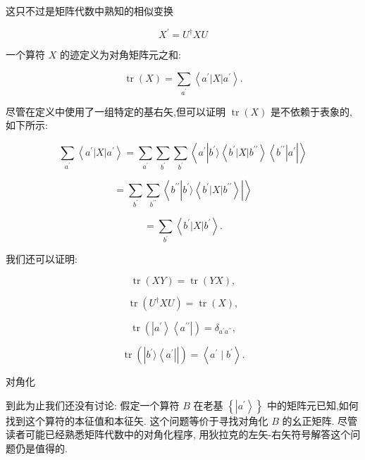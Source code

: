 \documentclass[lang=cn,newtx,10pt,scheme=chinese,thmcnt=section]{elegantbook}
\begin{document}
这只不过是矩阵代数中熟知的相似变换

$$
{X}^{\prime } = {U}^{ \dagger }{XU} \tag{1.5.13}
$$

一个算符 $X$ 的迹定义为对角矩阵元之和:

$$
\operatorname{tr}\left( X\right) = \mathop{\sum }\limits_{{a}^{\prime }}\left\langle {{a}^{\prime }\left| X\right| {a}^{\prime }}\right\rangle . \tag{1. 5.14}
$$

尽管在定义中使用了一组特定的基右矢,但可以证明 $\operatorname{tr}\left( X\right)$ 是不依赖于表象的,如下所示:

$$
\mathop{\sum }\limits_{{a}^{\prime }}\left\langle {{a}^{\prime }\left| X\right| {a}^{\prime }}\right\rangle = \mathop{\sum }\limits_{{a}^{\prime }}\mathop{\sum }\limits_{{b}^{\prime }}\mathop{\sum }\limits_{{b}^{\prime }}\left\langle {{a}^{\prime }\left| {{b}^{\prime }\rangle \left\langle {{b}^{\prime }\left| X\right| {b}^{\prime \prime }}\right\rangle \left\langle {b}^{\prime \prime }\right| {a}^{\prime }}\right| }\right\rangle
$$

$$
= \mathop{\sum }\limits_{{b}^{\prime }}\mathop{\sum }\limits_{{b}^{\prime \prime }}\left\langle {{b}^{\prime \prime }\left| {{b}^{\prime }\rangle \left\langle {{b}^{\prime }\left| X\right| {b}^{\prime \prime }}\right\rangle }\right| }\right\rangle \tag{1.5.15}
$$

$$
= \mathop{\sum }\limits_{{b}^{\prime }}\left\langle {{b}^{\prime }\left| X\right| {b}^{\prime }}\right\rangle .
$$

我们还可以证明:

$$
\operatorname{tr}\left( {XY}\right) = \operatorname{tr}\left( {YX}\right) , \tag{1.5.16a}
$$

$$
\operatorname{tr}\left( {{U}^{ \dagger }{XU}}\right) = \operatorname{tr}\left( X\right) , \tag{1.5.16b}
$$

$$
\operatorname{tr}\left( {\left| {a}^{\prime }\right\rangle \left\langle {a}^{\prime \prime }\right| }\right) = {\delta }_{{a}^{\prime }{a}^{\prime \prime }}, \tag{1.5.16c}
$$

$$
\operatorname{tr}\left( \left| {{b}^{\prime }\rangle \left\langle {a}^{\prime }\right| }\right| \right) = \left\langle {{a}^{\prime } \mid {b}^{\prime }}\right\rangle . \tag{1.5.16d}
$$

对角化

到此为止我们还没有讨论: 假定一个算符 $B$ 在老基 $\left\{ \left| {a}^{\prime }\right\rangle \right\}$ 中的矩阵元已知,如何找到这个算符的本征值和本征矢. 这个问题等价于寻找对角化 $B$ 的幺正矩阵. 尽管读者可能已经熟悉矩阵代数中的对角化程序, 用狄拉克的左矢-右矢符号解答这个问题仍是值得的.
\end{document}
